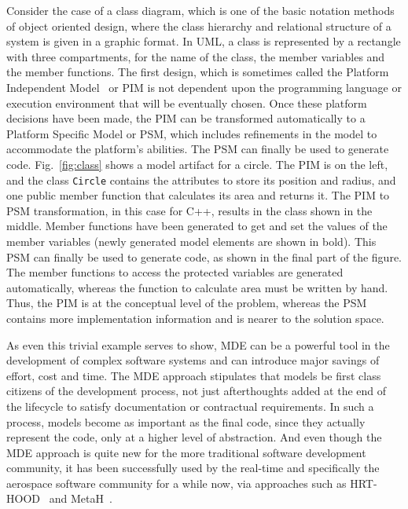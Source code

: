 Consider the case of a class diagram, which is one of the basic
notation methods of object oriented design, where the class hierarchy
and relational structure of a system is given in a graphic format. In
UML, a class is represented by a rectangle with three compartments,
for the name of the class, the member variables and the member
functions. The first design, which is sometimes called the Platform
Independent Model~\cite{mda-guide} or PIM is not dependent upon the
programming language or execution environment that will be eventually
chosen. Once these platform decisions have been made, the PIM can be
transformed automatically to a Platform Specific Model or PSM, which
includes refinements in the model to accommodate the platform's
abilities. The PSM can finally be used to generate
code. Fig.~\ref{fig:class} shows a model artifact for a circle. The
PIM is on the left, and the class \texttt{Circle} contains the
attributes to store its position and radius, and one public member
function that calculates its area and returns it. The PIM to PSM
transformation, in this case for C++, results in the class shown in
the middle. Member functions have been generated to get and set the
values of the member variables (newly generated model elements are
shown in bold). This PSM can finally be used to generate code, as
shown in the final part of the figure. The member functions to access
the protected variables are generated automatically, whereas the
function to calculate area must be written by hand. Thus, the PIM is
at the conceptual level of the problem, whereas the PSM contains more
implementation information and is nearer to the solution space.

As even this trivial example serves to show, MDE can be a powerful
tool in the development of complex software systems and can introduce
major savings of effort, cost and time. The MDE approach stipulates
that models be first class citizens of the development process, not
just afterthoughts added at the end of the lifecycle to satisfy
documentation or contractual requirements. In such a process, models
become as important as the final code, since they actually represent
the code, only at a higher level of abstraction. And even though the
MDE approach is quite new for the more traditional software
development community, it has been successfully used by the real-time
and specifically the aerospace software community for a while now, via
approaches such as HRT-HOOD~\cite{burns@rts94} and
MetaH~\cite{metah-manual}.

